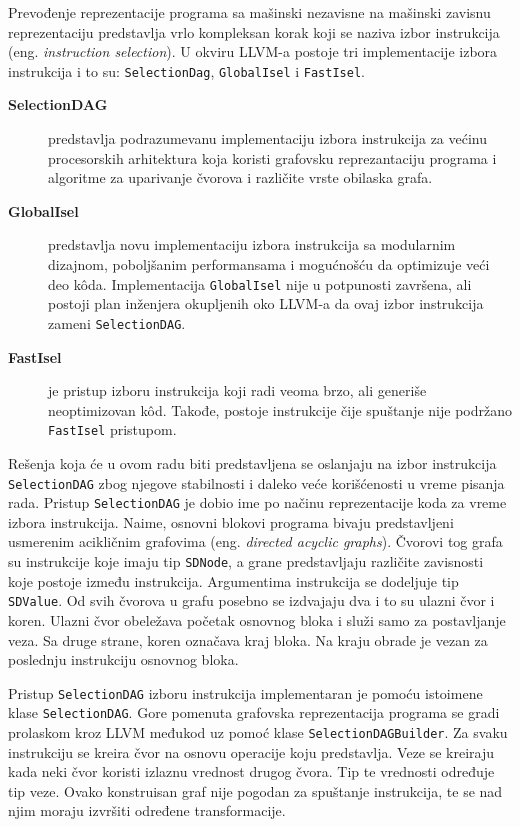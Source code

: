 \documentclass[12pt,oneside]{memoir}
\begin{document}
Prevođenje reprezentacije programa sa mašinski nezavisne na mašinski zavisnu reprezentaciju predstavlja vrlo kompleksan korak koji se naziva izbor instrukcija (eng. \textit{instruction selection}). U okviru LLVM-a postoje tri implementacije izbora instrukcija i to su: \texttt{SelectionDag}, \texttt{GlobalIsel} i \texttt{FastIsel}.

\begin{description}
\item[\textbf{SelectionDAG}] predstavlja podrazumevanu implementaciju izbora instrukcija za većinu procesorskih arhitektura koja koristi grafovsku reprezantaciju programa i algoritme za uparivanje čvorova i različite vrste obilaska grafa.

\item[\textbf{GlobalIsel}] predstavlja novu implementaciju izbora instrukcija sa modularnim dizajnom,
poboljšanim performansama i mogućnošću da optimizuje veći deo kôda. 
Implementacija \texttt{GlobalIsel} nije u potpunosti završena, ali postoji plan inženjera okupljenih oko LLVM-a da ovaj izbor instrukcija zameni \texttt{SelectionDAG}.

\item[\textbf{FastIsel}] je pristup izboru instrukcija koji radi veoma brzo, ali generiše neoptimizovan k\^od. Takođe, postoje instrukcije čije spuštanje nije podržano \texttt{FastIsel} pristupom. 
\end{description}
Rešenja koja će u ovom radu biti predstavljena se oslanjaju na izbor instrukcija \texttt{SelectionDAG} zbog njegove stabilnosti i daleko veće korišćenosti u vreme pisanja rada.
Pristup \texttt{SelectionDAG} je dobio ime po načinu reprezentacije koda za
vreme izbora instrukcija. Naime, osnovni blokovi programa bivaju predstavljeni usmerenim acikličnim grafovima (eng. \textit{directed acyclic graphs}). Čvorovi tog grafa su instrukcije koje imaju tip \texttt{SDNode}, a grane predstavljaju različite zavisnosti koje postoje između instrukcija. Argumentima instrukcija se dodeljuje tip \texttt{SDValue}. Od svih čvorova u grafu posebno se izdvajaju dva i to su ulazni čvor i koren. Ulazni čvor obeležava početak osnovnog bloka i služi samo za postavljanje veza. Sa druge strane, koren označava kraj bloka. Na kraju obrade je vezan za poslednju instrukciju osnovnog bloka.

Pristup \texttt{SelectionDAG}  izboru instrukcija implementaran je pomoću istoimene klase \texttt{SelectionDAG}. Gore pomenuta grafovska reprezentacija programa se gradi prolaskom kroz LLVM međukod uz pomoć klase \texttt{SelectionDAGBuilder}. Za svaku instrukciju se kreira čvor na osnovu operacije koju predstavlja. Veze se kreiraju kada neki čvor
koristi izlaznu vrednost drugog čvora. Tip te vrednosti određuje tip veze. Ovako konstruisan graf nije pogodan za spuštanje instrukcija, te se nad njim moraju izvršiti određene transformacije. 
\end{document}

